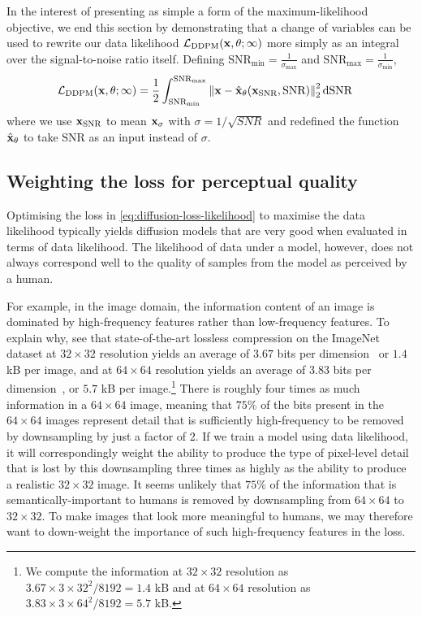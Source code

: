 In the interest of presenting as simple a form of the maximum-likelihood objective, we end this section by demonstrating that a change of variables can be used to rewrite our data likelihood $\mathcal{L}_\text{DDPM}({\mathbf{x}}, \theta; \infty)$ more simply as an integral over the signal-to-noise ratio itself. Defining $\text{SNR}_\text{min} = \frac{1}{\sigma_\text{max}}$ and $\text{SNR}_\text{max} = \frac{1}{\sigma_\text{min}}$,
\begin{align}
    \mathcal{L}_\text{DDPM}({\mathbf{x}}, \theta; \infty) &= \frac{1}{2} \int_{\text{SNR}_\text{min}}^{\text{SNR}_\text{max}} \left\| {\mathbf{x}} - \hat{{\mathbf{x}}}_\theta({\mathbf{x}}_\text{SNR}, \text{SNR}) \right\|_2^2 \mathrm{d}\text{SNR} \label{eq:diffusion-integral-dsnr}
\end{align}
where we use ${\mathbf{x}}_\text{SNR}$ to mean ${\mathbf{x}}_\sigma$ with $\sigma = 1 / \sqrt{SNR}$ and redefined the function $\hat{{\mathbf{x}}}_\theta$ to take $\text{SNR}$ as an input instead of $\sigma$.


\subsection{Weighting the loss for perceptual quality} \label{sec:diffusion-perceptual-quality}
Optimising the loss in \cref{eq:diffusion-loss-likelihood} to maximise the data likelihood typically yields diffusion models that are very good when evaluated in terms of data likelihood. The likelihood of data under a model, however, does not always correspond well to the quality of samples from the model as perceived by a human. 

For example, in the image domain, the information content of an image is dominated by high-frequency features rather than low-frequency features. To explain why, see that state-of-the-art lossless compression on the ImageNet dataset at $32\times32$ resolution yields an average of $3.67$ bits per dimension~\citep{sahoo2023diffusion} or $1.4$ kB per image, and at $64\times64$ resolution yields an average of 3.83 bits per dimension~\citep{finlay2020train}, or $5.7$ kB per image.\footnote{We compute the information at $32\times32$ resolution as $3.67\times3\times32^2 / 8192 = 1.4$ kB and at $64\times64$ resolution as $3.83\times3\times64^2 / 8192 = 5.7$ kB.} There is roughly four times as much information in a $64\times64$ image, meaning that $75\%$ of the bits present in the $64\times64$ images represent detail that is sufficiently high-frequency to be removed by downsampling by just a factor of 2. If we train a model using data likelihood, it will correspondingly weight the ability to produce the type of pixel-level detail that is lost by this downsampling three times as highly as the ability to produce a realistic $32\times32$ image. It seems unlikely that $75\%$ of the information that is semantically-important to humans is removed by downsampling from $64\times64$ to $32\times32$. To make images that look more meaningful to humans, we may therefore want to down-weight the importance of such high-frequency features in the loss.

